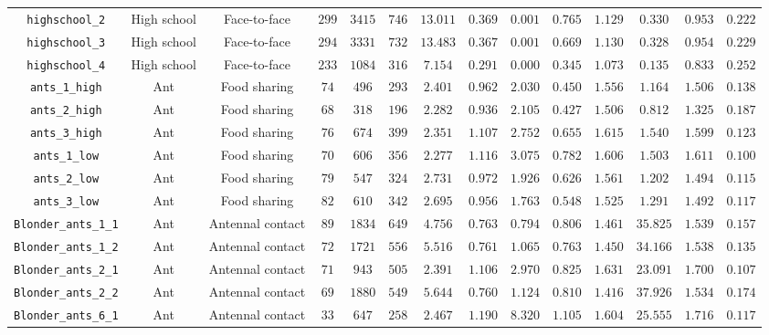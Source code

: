 \documentclass[10pt]{article}
\begin{document}
\begin{landscape}
\begin{table}[t]
\begin{tabular}{c|ccccccccccccc}
\verb|highschool_2| & High school & Face-to-face & $299$ & $3415$ & $746$ & $13.011$ & $0.369$ & $0.001$ & $0.765$ & $1.129$ & $0.330$ & $0.953$ & $0.222$\\
\verb|highschool_3| & High school & Face-to-face & $294$ & $3331$ & $732$ & $13.483$ & $0.367$ & $0.001$ & $0.669$ & $1.130$ & $0.328$ & $0.954$ & $0.229$\\
\verb|highschool_4| & High school & Face-to-face & $233$ & $1084$ & $316$ & $7.154$ & $0.291$ & $0.000$ & $0.345$ & $1.073$ & $0.135$ & $0.833$ & $0.252$\\
\verb|ants_1_high| & Ant & Food sharing & $74$ & $496$ & $293$ & $2.401$ & $0.962$ & $2.030$ & $0.450$ & $1.556$ & $1.164$ & $1.506$ & $0.138$\\
\verb|ants_2_high| & Ant & Food sharing & $68$ & $318$ & $196$ & $2.282$ & $0.936$ & $2.105$ & $0.427$ & $1.506$ & $0.812$ & $1.325$ & $0.187$\\
\verb|ants_3_high| & Ant & Food sharing & $76$ & $674$ & $399$ & $2.351$ & $1.107$ & $2.752$ & $0.655$ & $1.615$ & $1.540$ & $1.599$ & $0.123$\\
\verb|ants_1_low| & Ant & Food sharing & $70$ & $606$ & $356$ & $2.277$ & $1.116$ & $3.075$ & $0.782$ & $1.606$ & $1.503$ & $1.611$ & $0.100$\\
\verb|ants_2_low| & Ant & Food sharing & $79$ & $547$ & $324$ & $2.731$ & $0.972$ & $1.926$ & $0.626$ & $1.561$ & $1.202$ & $1.494$ & $0.115$\\
\verb|ants_3_low| & Ant & Food sharing & $82$ & $610$ & $342$ & $2.695$ & $0.956$ & $1.763$ & $0.548$ & $1.525$ & $1.291$ & $1.492$ & $0.117$\\
\verb|Blonder_ants_1_1| & Ant & Antennal contact & $89$ & $1834$ & $649$ & $4.756$ & $0.763$ & $0.794$ & $0.806$ & $1.461$ & $35.825$ & $1.539$ & $0.157$\\
\verb|Blonder_ants_1_2| & Ant & Antennal contact & $72$ & $1721$ & $556$ & $5.516$ & $0.761$ & $1.065$ & $0.763$ & $1.450$ & $34.166$ & $1.538$ & $0.135$\\
\verb|Blonder_ants_2_1| & Ant & Antennal contact & $71$ & $943$ & $505$ & $2.391$ & $1.106$ & $2.970$ & $0.825$ & $1.631$ & $23.091$ & $1.700$ & $0.107$\\
\verb|Blonder_ants_2_2| & Ant & Antennal contact & $69$ & $1880$ & $549$ & $5.644$ & $0.760$ & $1.124$ & $0.810$ & $1.416$ & $37.926$ & $1.534$ & $0.174$\\
\verb|Blonder_ants_6_1| & Ant & Antennal contact & $33$ & $647$ & $258$ & $2.467$ & $1.190$ & $8.320$ & $1.105$ & $1.604$ & $25.555$ & $1.716$ & $0.117$\\

\end{tabular}
\end{table}
\end{landscape}
\end{document}
